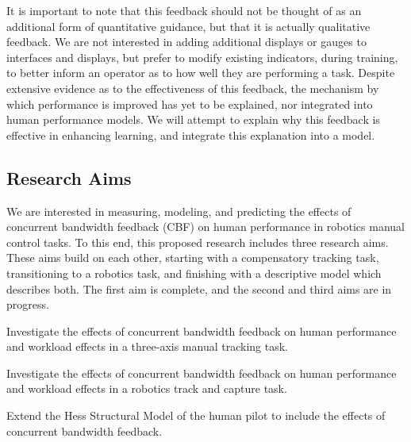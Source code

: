 \documentclass[float=false, crop=false]{standalone}
\begin{document}
It is important to note that this feedback should not be thought of as an additional form of quantitative guidance, but that it is actually qualitative feedback.
We are not interested in adding additional displays or gauges to interfaces and displays, but prefer to modify existing indicators, during training, to better inform an operator as to how well they are performing a task.
Despite extensive evidence as to the effectiveness of this feedback, the mechanism by which performance is improved has yet to be explained, nor integrated into human performance models.
We will attempt to explain why this feedback is effective in enhancing learning, and integrate this explanation into a model.

\subsection{Research Aims}
We are interested in measuring, modeling, and predicting the effects of concurrent bandwidth feedback (CBF) on human performance in robotics manual control tasks.
To this end, this proposed research includes three research aims.
These aims build on each other, starting with a compensatory tracking task, transitioning to a robotics task, and finishing with a descriptive model which describes both.
The first aim is complete, and the second and third aims are in progress.
\begin{description}[align=left]
\item [Aim One] Investigate the effects of concurrent bandwidth feedback on human performance and workload effects in a three-axis manual tracking task.
\item [Aim Two] Investigate the effects of concurrent bandwidth feedback on human performance and workload effects in a robotics track and capture task.
\item [Aim Three] Extend the Hess Structural Model of the human pilot to include the effects of concurrent bandwidth feedback.
\end{description}
\end{document}
